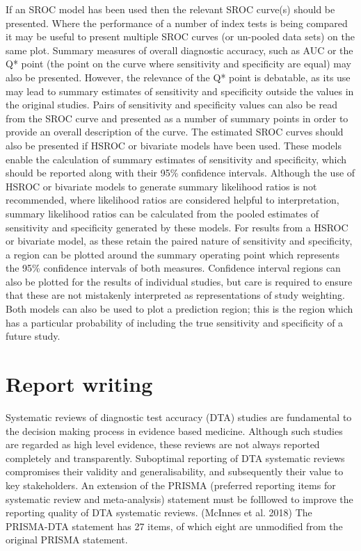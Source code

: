 \documentclass[
  11pt,
  a4paper,
  DIV=11,
  numbers=noendperiod]{scrreprt}
\begin{document}
If an SROC model has been used then the relevant SROC curve(s) should be
presented. Where the performance of a number of index tests is being
compared it may be useful to present multiple SROC curves (or un-pooled
data sets) on the same plot. Summary measures of overall diagnostic
accuracy, such as AUC or the Q* point (the point on the curve where
sensitivity and specificity are equal) may also be presented. However,
the relevance of the Q* point is debatable, as its use may lead to
summary estimates of sensitivity and specificity outside the values in
the original studies. Pairs of sensitivity and specificity values can
also be read from the SROC curve and presented as a number of summary
points in order to provide an overall description of the curve. The
estimated SROC curves should also be presented if HSROC or bivariate
models have been used. These models enable the calculation of summary
estimates of sensitivity and specificity, which should be reported along
with their 95\% confidence intervals. Although the use of HSROC or
bivariate models to generate summary likelihood ratios is not
recommended, where likelihood ratios are considered helpful to
interpretation, summary likelihood ratios can be calculated from the
pooled estimates of sensitivity and specificity generated by these
models. For results from a HSROC or bivariate model, as these retain the
paired nature of sensitivity and specificity, a region can be plotted
around the summary operating point which represents the 95\% confidence
intervals of both measures. Confidence interval regions can also be
plotted for the results of individual studies, but care is required to
ensure that these are not mistakenly interpreted as representations of
study weighting. Both models can also be used to plot a prediction
region; this is the region which has a particular probability of
including the true sensitivity and specificity of a future study.

\section{Report writing}\label{report-writing-1}

Systematic reviews of diagnostic test accuracy (DTA) studies are
fundamental to the decision making process in evidence based medicine.
Although such studies are regarded as high level evidence, these reviews
are not always reported completely and transparently. Suboptimal
reporting of DTA systematic reviews compromises their validity and
generalisability, and subsequently their value to key stakeholders. An
extension of the PRISMA (preferred reporting items for systematic review
and meta-analysis) statement must be folllowed to improve the reporting
quality of DTA systematic reviews. (McInnes et al. 2018) The PRISMA-DTA
statement has 27 items, of which eight are unmodified from the original
PRISMA statement.
\end{document}
